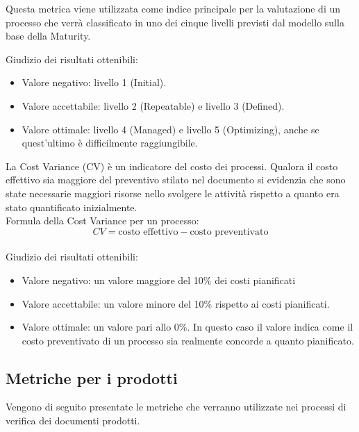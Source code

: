 \documentclass[a4paper, titlepage]{article}
\begin{document}
\label{par:cmm}
Questa metrica viene utilizzata come indice principale per la valutazione di un processo che verrà classificato in uno dei cinque livelli previsti dal modello sulla base della Maturity.
\par Giudizio dei risultati ottenibili:
\begin{itemize}
\item Valore negativo: livello 1 (Initial).
\item Valore accettabile: livello 2 (Repeatable) e livello 3 (Defined).
\item Valore ottimale: livello 4 (Managed) e livello 5 (Optimizing), anche se quest'ultimo è difficilmente raggiungibile.
\end{itemize}

\label{par:CV}
La Cost Variance (CV) è un indicatore del costo dei processi. Qualora il costo effettivo sia maggiore del preventivo stilato nel documento  si evidenzia che sono state necessarie maggiori risorse nello svolgere le attività rispetto a quanto era stato quantificato inizialmente.
\\Formula della Cost Variance per un processo:
\begin{displaymath}
CV= \mbox{costo effettivo} - \mbox{costo preventivato}
\end{displaymath}
\\ Giudizio dei risultati ottenibili:
\begin{itemize}
\item Valore negativo: un valore maggiore del 10\% dei costi pianificati
\item Valore accettabile: un valore minore del 10\% rispetto ai costi pianificati.
\item Valore ottimale: un valore pari allo 0\%. In questo caso il valore indica come il costo preventivato di un processo sia realmente concorde a quanto pianificato. 
\end{itemize}

\subsection{Metriche per i prodotti}

Vengono di seguito presentate le metriche che verranno utilizzate nei processi di verifica dei documenti prodotti.
\end{document}
